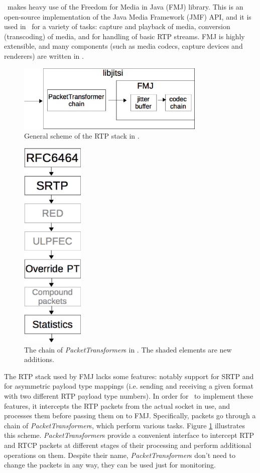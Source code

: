 \documentclass[twoside,openright,a4paper,12pt,english]{article}
\begin{document}
\lj\ makes heavy use of the Freedom for Media in Java
(FMJ\cite{fmj}) library. This is an
open-source implementation of the Java Media Framework (JMF) API, and it is
used in \lj\ for a variety of tasks: capture and playback of media, conversion
(transcoding) of media, and for handling of basic RTP streams. FMJ is highly extensible, and
many components (such as media codecs, capture devices and renderers) are written in \lj.

\begin{figure}[h]
    \centering
    \includegraphics[width=9cm]{./pics/lj.eps}
    \caption{General scheme of the RTP stack in \lj.}
    \label{lj-scheme}
\end{figure}



\begin{figure}
   \centering
        \includegraphics[width=3cm]{./pics/lj-pt.eps}
        \caption{The chain of \emph{PacketTransformer}s in \lj. The shaded elements are new additions.}
   \label{lj-pt}
\end{figure}
The RTP stack used by FMJ lacks some features: notably support for SRTP and 
for asymmetric payload type mappings (i.e. sending and receiving a given format
with two different RTP payload type numbers). In order for \lj\ to implement these features, it
intercepts the RTP packets from the actual socket in use, and processes them
before passing them on to FMJ. Specifically, packets go through a chain of
\emph{PacketTransformer}s, which perform various tasks. Figure \ref{lj-scheme}
illustrates this scheme.
\emph{PacketTransformer}s provide a convenient interface to intercept RTP and
RTCP packets at different stages of their processing and perform additional
operations on them. Despite their name, \emph{PacketTransformer}s don't need to change
the packets in any way, they can be used just for monitoring. 
\end{document}
